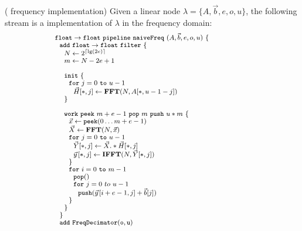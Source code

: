 \begin{transformation} ({\Naive} frequency implementation)
Given a linear node $\lambda = \{A, {\vec b}, e, o, u\}$, the
following stream is a {\naive} implementation of $\lambda$ in the
frequency domain: \\
\begin{equation} \nonumber
{\small
  \begin{array}{ll}
    {\tt float \rightarrow float}~{\tt pipeline~naiveFreq~}(A, {\vec b}, e, o, u){\tt ~\{} & \hspace{40pt}\\
    ~~{\tt add~float \rightarrow float~filter~\{}\\
    ~~~~N \leftarrow 2^{\lceil \lg(2e) \rceil} \\
    ~~~~m \leftarrow N-2e+1 \\
    \\
    ~~~~{\tt init}~{\tt \{} \\
    ~~~~~~{\tt for}~j=0~{\tt to}~u-1\\
    ~~~~~~~~\vec{H}[*,j] \leftarrow \mathbf{FFT}(N,A[*,u-1-j]) \\
    ~~~~{\tt \}} \\
    \\
    ~~~~{\tt work}~{\tt peek}~m+e-1~{\tt pop}~m~{\tt push}~u*m~{\tt \{} \\
    ~~~~~~\vec{x} \leftarrow {\tt peek}(0 \dots m+e-1 ) \\
    ~~~~~~\vec{X} \leftarrow \mathbf{FFT} (N, \vec{x}) \\
    ~~~~~~{\tt for}~j=0~{\tt to}~u-1\\
    ~~~~~~~~\vec{Y}[*,j] \leftarrow \vec{X} .* \vec{H}[*,j] \\
    ~~~~~~~~\vec{y}\hspace{1pt}[*,j] \leftarrow \mathbf{IFFT}(N, \vec{Y}[*,j]) \\
    ~~~~~~{\tt \}} \\
    ~~~~~~{\tt for}~i=0~{\tt to}~m-1\\
    ~~~~~~~~{\tt pop()} \\
    ~~~~~~~~{\tt for}~j=0~to~u-1\\
    ~~~~~~~~~~{\tt push}(\vec{y}\hspace{1pt}[i+e-1,j] + {\vec b}[j])\\
    ~~~~~~{\tt \}} \\
    ~~~~{\tt \}} \\
    ~~{\tt \}} \\
    ~~{\tt add~FreqDecimator(o, u)} \\

\end{array}}
\end{equation}
\end{transformation}
